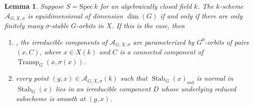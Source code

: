 \documentclass[11pt,reqno]{amsart}
\newtheorem{lemma}[theorem]{Lemma}
\theoremstyle{definition}
\renewcommand{\rm}{\mathrm}
\newcommand{\Spec}{\mathrm{Spec} \,}
\newcommand{\sA}{{\mathscr A}}
\DeclareMathOperator{\Stab}{Stab}
\DeclareMathOperator{\Transp}{Transp}
\begin{document}
\begin{lemma}\label{lemma:irr-comps-of-l-param}
    Suppose $S = \Spec k$ for an algebraically closed field $k$. The $k$-scheme $\sA_{G, X, \sigma}$ is equidimensional of dimension $\dim(G)$ if and only if there are only finitely many $\sigma$-stable $G$-orbits in $X$. If this is the case, then
    \begin{enumerate}
        \item \cite[Corollary 2.4]{DHKM}, \cite[Corollary 2.7]{Shotton-irreducible} the irreducible components of $\sA_{G, X, \sigma}$ are parameterized by $G^0$-orbits of pairs $(x, C)$, where $x \in X(k)$ and $C$ is a connected component of $\Transp_G(x, \sigma(x))$.
        \item \cite[Remark 6.23]{Booher-Tang} every point $(g, x) \in \sA_{G, X, \sigma}(k)$ such that $\Stab_G(x)_{\rm{red}}$ is normal in $\Stab_G(x)$ lies in an irreducible component $D$ whose underlying reduced subscheme is smooth at $(g, x)$.
    \end{enumerate}
\end{lemma}
\end{document}
